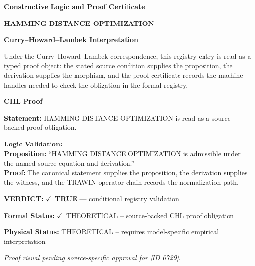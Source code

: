\clearpage
\begingroup\tzpsupportsetup
\noindent\textbf{\fontsize{10.8pt}{12.8pt}\selectfont [ID 0729] Constructive Logic and Proof Certificate}\par
\noindent\textbf{\fontsize{10pt}{12pt}\selectfont HAMMING DISTANCE OPTIMIZATION}\par
\vspace{0.45em}
\begingroup
\footnotesize
\setlength{\parskip}{0.22em}
\setlength{\parindent}{0pt}
\noindent\textbf{Curry--Howard--Lambek Interpretation}\par
Under the Curry--Howard--Lambek correspondence, this registry entry is read as a typed proof
object: the stated source condition supplies the proposition, the derivation supplies the
morphism, and the proof certificate records the machine handles needed to check the obligation
in the formal registry.

\vspace{0.45em}
\noindent\textbf{CHL Proof}\par
\textbf{Statement:} HAMMING DISTANCE OPTIMIZATION is read as a source-backed proof obligation.

\textbf{Logic Validation:}\\
\textbf{Proposition:} ``HAMMING DISTANCE OPTIMIZATION is admissible under the named source equation and derivation.''\\
\textbf{Proof:} The canonical statement supplies the proposition, the derivation supplies the witness, and the TRAWIN operator chain records the normalization path.

\textbf{VERDICT:} \ensuremath{\checkmark}\ \textbf{TRUE} --- conditional registry validation

\textbf{Formal Status:} \ensuremath{\checkmark}\ THEORETICAL -- source-backed CHL proof obligation

\textbf{Physical Status:} THEORETICAL -- requires model-specific empirical interpretation
\par\vspace{0.45em}
\par
\vfill
\begingroup\footnotesize\itshape
Proof visual pending source-specific approval for [ID 0729].
\par\endgroup
\vfill
\endgroup
\endgroup
